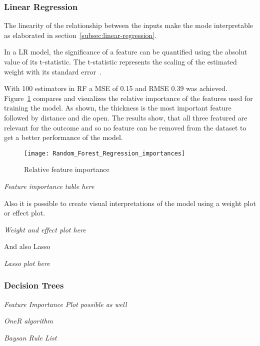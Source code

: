 \subsubsection{Linear Regression}\label{subsubsec:linear-regression}
The linearity of the relationship between the inputs make the mode
interpretable as elaborated in section~\ref{subsec:linear-regression}.

In a \ac{LR} model, the significance of a feature can be quantified using the
absolut value of its t-statistic. The t-statistic represents the scaling of
the estimated weight with its standard error~\cite[p.
40]{molnar2020interpretable}.

With 100 estimators in \ac{RF} a \ac{MSE} of 0.15 and \ac{RMSE} 0.39 was
achieved.
Figure~\ref{fig:rf_feature_importance} compares and visualizes the relative
importance of the
features used for
training the model.
As shown, the thickness is the most important feature followed by distance
and die open. The
results show, that all
three featured are relevant for the outcome and so no feature can be removed
from the dataset to
get a better
performance of the model.

\begin{figure}[htb]
    \begin{tcolorbox}[arc=0pt,boxrule=0.5pt]
        \centering
        \texttt{[image: Random\_Forest\_Regression\_importances]}
        \caption{Relative feature importance}
        \label{fig:rf_feature_importance}
    \end{tcolorbox}
\end{figure}


\textit{Feature importance table here}

Also it is possible to create visual interpretations of the model using
a weight plot or effect plot.

\textit{Weight and effect plot here}

And also Lasso

\textit{Lasso plot here}

\subsubsection{Decision Trees}\label{subsubsec:decision-trees}

\textit{Feature Importance Plot possible as well}

\textit{OneR algorithm}

\textit{Baysan Rule List}


